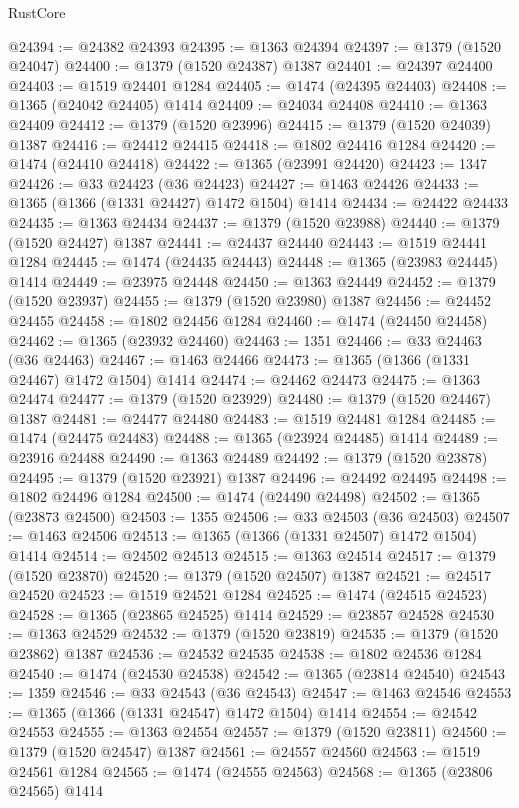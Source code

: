\begin{lexlean}{RustCore}
\begin{coremodule}
@24394 := @24382 @24393
@24395 := @1363 @24394
@24397 := @1379 (@1520 @24047)
@24400 := @1379 (@1520 @24387) @1387
@24401 := @24397 @24400
@24403 := @1519 @24401 @1284
@24405 := @1474 (@24395 @24403)
@24408 := @1365 (@24042 @24405) @1414
@24409 := @24034 @24408
@24410 := @1363 @24409
@24412 := @1379 (@1520 @23996)
@24415 := @1379 (@1520 @24039) @1387
@24416 := @24412 @24415
@24418 := @1802 @24416 @1284
@24420 := @1474 (@24410 @24418)
@24422 := @1365 (@23991 @24420)
@24423 := 1347
@24426 := @33 @24423 (@36 @24423)
@24427 := @1463 @24426
@24433 := @1365 (@1366 (@1331 @24427) @1472 @1504) @1414
@24434 := @24422 @24433
@24435 := @1363 @24434
@24437 := @1379 (@1520 @23988)
@24440 := @1379 (@1520 @24427) @1387
@24441 := @24437 @24440
@24443 := @1519 @24441 @1284
@24445 := @1474 (@24435 @24443)
@24448 := @1365 (@23983 @24445) @1414
@24449 := @23975 @24448
@24450 := @1363 @24449
@24452 := @1379 (@1520 @23937)
@24455 := @1379 (@1520 @23980) @1387
@24456 := @24452 @24455
@24458 := @1802 @24456 @1284
@24460 := @1474 (@24450 @24458)
@24462 := @1365 (@23932 @24460)
@24463 := 1351
@24466 := @33 @24463 (@36 @24463)
@24467 := @1463 @24466
@24473 := @1365 (@1366 (@1331 @24467) @1472 @1504) @1414
@24474 := @24462 @24473
@24475 := @1363 @24474
@24477 := @1379 (@1520 @23929)
@24480 := @1379 (@1520 @24467) @1387
@24481 := @24477 @24480
@24483 := @1519 @24481 @1284
@24485 := @1474 (@24475 @24483)
@24488 := @1365 (@23924 @24485) @1414
@24489 := @23916 @24488
@24490 := @1363 @24489
@24492 := @1379 (@1520 @23878)
@24495 := @1379 (@1520 @23921) @1387
@24496 := @24492 @24495
@24498 := @1802 @24496 @1284
@24500 := @1474 (@24490 @24498)
@24502 := @1365 (@23873 @24500)
@24503 := 1355
@24506 := @33 @24503 (@36 @24503)
@24507 := @1463 @24506
@24513 := @1365 (@1366 (@1331 @24507) @1472 @1504) @1414
@24514 := @24502 @24513
@24515 := @1363 @24514
@24517 := @1379 (@1520 @23870)
@24520 := @1379 (@1520 @24507) @1387
@24521 := @24517 @24520
@24523 := @1519 @24521 @1284
@24525 := @1474 (@24515 @24523)
@24528 := @1365 (@23865 @24525) @1414
@24529 := @23857 @24528
@24530 := @1363 @24529
@24532 := @1379 (@1520 @23819)
@24535 := @1379 (@1520 @23862) @1387
@24536 := @24532 @24535
@24538 := @1802 @24536 @1284
@24540 := @1474 (@24530 @24538)
@24542 := @1365 (@23814 @24540)
@24543 := 1359
@24546 := @33 @24543 (@36 @24543)
@24547 := @1463 @24546
@24553 := @1365 (@1366 (@1331 @24547) @1472 @1504) @1414
@24554 := @24542 @24553
@24555 := @1363 @24554
@24557 := @1379 (@1520 @23811)
@24560 := @1379 (@1520 @24547) @1387
@24561 := @24557 @24560
@24563 := @1519 @24561 @1284
@24565 := @1474 (@24555 @24563)
@24568 := @1365 (@23806 @24565) @1414

\end{coremodule}
\end{lexlean}

